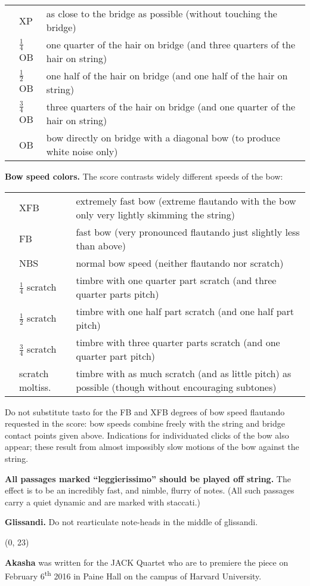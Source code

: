 \documentclass[10pt]{article}
\begin{document}
\begin{textblock}{23}
\begin{tabu}{l l l}
\phantom{M} & XP & as close to the bridge as possible (without touching the bridge) \\
            & $\frac{1}{4}$OB & one quarter of the hair on bridge (and three quarters of the hair on string) \\
            & $\frac{1}{2}$OB & one half of the hair on bridge (and one half of the hair on string) \\
            & $\frac{3}{4}$OB & three quarters of the hair on bridge (and one quarter of the hair on string) \\
            & OB & bow directly on bridge with a diagonal bow (to produce white noise only) \\
\end{tabu}

\textbf{Bow speed colors.} The score contrasts widely different speeds of the bow:
 
\begin{tabu}{l l l}
\phantom{M} & XFB & extremely fast bow (extreme flautando with the bow only very lightly skimming the string) \\
            & FB & fast bow (very pronounced flautando just slightly less than above) \\
            & NBS & normal bow speed (neither flautando nor scratch) \\
            & $\frac{1}{4}$ scratch & timbre with one quarter part scratch (and three quarter parts pitch) \\
            & $\frac{1}{2}$ scratch & timbre with one half part scratch (and one half part pitch) \\
            & $\frac{3}{4}$ scratch & timbre with three quarter parts scratch (and one quarter part pitch) \\
            & scratch moltiss. & timbre with as much scratch (and as little pitch) as possible (though without encouraging subtones) \\
\end{tabu}

Do not substitute tasto for the FB and XFB degrees of bow speed flautando
requested in the score: bow speeds combine freely with the string and bridge
contact points given above. Indications for individuated clicks of the bow also
appear; these result from almost impossibly slow motions of the bow against the
string.

\textbf{All passages marked ``leggierissimo'' should be played off string.} The
effect is to be an incredibly fast, and nimble, flurry of notes. (All such
passages carry a quiet dynamic and are marked with staccati.)

\textbf{Glissandi.} Do not rearticulate note-heads in the middle of glissandi.

\end{textblock}

\begin{textblock}{23}(0, 23)

\textbf{Akasha} was written for the JACK Quartet who are to premiere the piece
on February 6\textsuperscript{th} 2016 in Paine Hall on the campus of Harvard
University.

\end{textblock}
\end{document}
